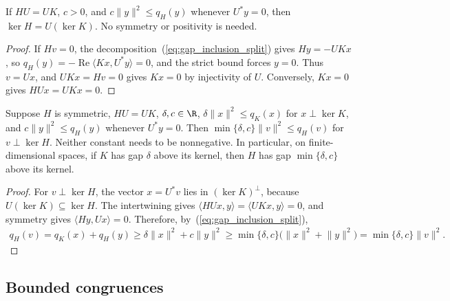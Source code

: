 \begin{lemma}
    \label{lem:gap_inclusion_kernel}
    \leanok
    If $HU=UK$, $c>0$, and $c\lVert y\rVert^2\le q_H(y)$ whenever $U^*y=0$, then
    $\ker H=U(\ker K)$. No symmetry or positivity is needed.
\end{lemma}
\begin{proof}\leanok
    If $Hv=0$, the decomposition~(\ref{eq:gap_inclusion_split}) gives $Hy=-UKx$, so
    $q_H(y)=-\operatorname{Re}\langle Kx,U^*y\rangle=0$, and the strict bound forces
    $y=0$. Thus $v=Ux$, and $UKx=Hv=0$ gives $Kx=0$ by injectivity of $U$. Conversely,
    $Kx=0$ gives $HUx=UKx=0$.
\end{proof}

\begin{lemma}
    \label{lem:gap_inclusion_quadratic}
    \leanok
    Suppose $H$ is symmetric, $HU=UK$, $\delta,c\in\R$, $\delta\lVert x\rVert^2\le
        q_K(x)$ for $x\perp\ker K$, and $c\lVert y\rVert^2\le q_H(y)$ whenever $U^*y=0$.
    Then $\min\{\delta,c\}\lVert v\rVert^2\le q_H(v)$ for $v\perp\ker H$. Neither
    constant needs to be nonnegative. In particular, on finite-dimensional spaces, if $K$
    has gap $\delta$ above its kernel, then $H$ has gap $\min\{\delta,c\}$ above its
    kernel.
\end{lemma}
\begin{proof}\leanok
    For $v\perp\ker H$, the vector $x=U^*v$ lies in $(\ker K)^\perp$, because
    $U(\ker K)\subseteq\ker H$. The intertwining gives $\langle HUx,y\rangle=
        \langle UKx,y\rangle=0$, and symmetry gives $\langle Hy,Ux\rangle=0$. Therefore,
    by~(\ref{eq:gap_inclusion_split}),
    \begin{align*}
        q_H(v)=q_K(x)+q_H(y)\ge\delta\lVert x\rVert^2+c\lVert y\rVert^2
        \ge\min\{\delta,c\}\bigl(\lVert x\rVert^2+\lVert y\rVert^2\bigr)
        =\min\{\delta,c\}\lVert v\rVert^2.
    \end{align*}
\end{proof}

\subsection{Bounded congruences}
\label{sec:martingale_gaps_congruence}

